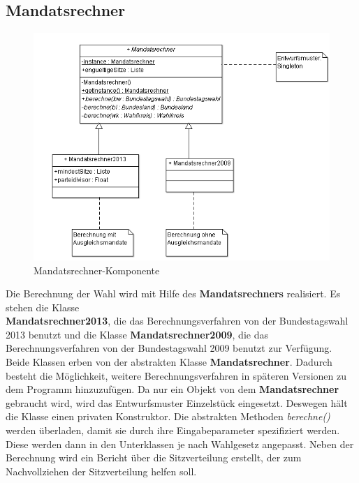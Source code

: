 \documentclass[12pt,a4paper,titlepage]{article}
\newcommand{\myma}{\fontfamily{pcr}\selectfont \textbf}
\newcommand{\mymo}{\fontfamily{pcr}\selectfont \textit}
\begin{document}
\newpage
\subsection{Mandatsrechner}
\begin{figure}[!ht]
\centering
\includegraphics[scale=0.6]{Mandatsrechneralles.png} \caption{Mandatsrechner-Komponente} 
\end{figure}
Die Berechnung der Wahl wird mit Hilfe des {\myma{Mandatsrechners}} realisiert. Es stehen die Klasse \\{\myma{Mandatsrechner2013}}, die das Berechnungsverfahren von der Bundestagswahl 2013 benutzt und die Klasse {\myma{Mandatsrechner2009}}, die das Berechnungsverfahren von der Bundestagswahl 2009 benutzt zur Verfügung. Beide Klassen erben von der abstrakten Klasse {\myma{Mandatsrechner}}. Dadurch besteht die Möglichkeit, weitere Berechnungsverfahren in späteren Versionen zu dem Programm hinzuzufügen. Da nur ein Objekt von dem {\myma{Mandatsrechner}} gebraucht wird, wird das Entwurfsmuster Einzelstück eingesetzt. Deswegen hält die Klasse einen privaten Konstruktor. Die abstrakten Methoden {\mymo{berechne()}} werden überladen, damit sie durch ihre Eingabeparameter spezifiziert werden. Diese werden dann in den Unterklassen je nach Wahlgesetz angepasst. Neben der Berechnung wird ein Bericht über die Sitzverteilung erstellt, der zum Nachvollziehen der Sitzverteilung helfen soll.
\begin{large}
\end{large}
\end{document}

